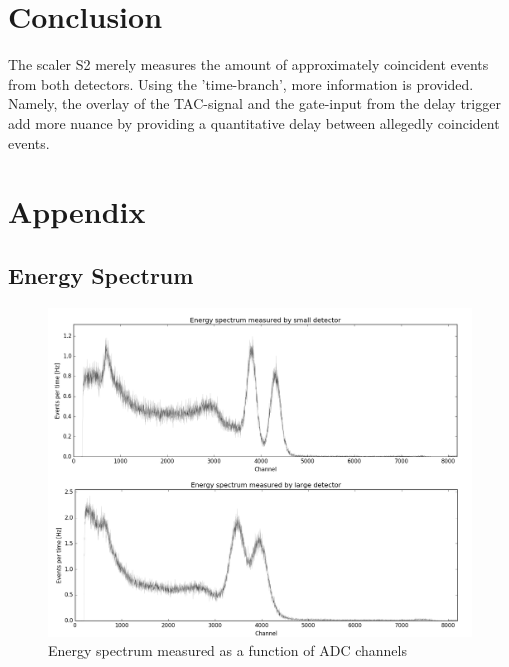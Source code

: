 \documentclass[a4paper,parskip,11pt, DIV12]{scrreprt}
\begin{document}
\chapter{Conclusion}

The scaler S2 merely measures the amount of approximately coincident events from both detectors. Using the 'time-branch', more information is provided. Namely, the overlay of the TAC-signal and the gate-input from the delay trigger add more nuance by providing a quantitative delay between allegedly coincident events.

\chapter{Appendix}

\section{Energy Spectrum}
%
\begin{figure}[H]
\centering
\includegraphics[scale=0.35]{EnergyRaw.png}
\caption[EnergyRaw]{Energy spectrum measured as a function of ADC channels}
\label{fig:EnergyRaw}
\end{figure}
\end{document}
